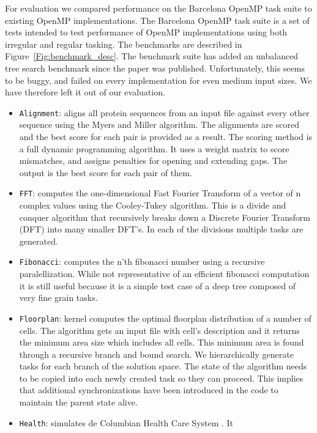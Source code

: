 \documentclass[sigconf]{acmart}
\begin{document}
For evaluation we compared performance on the Barcelona OpenMP task suite to 
existing OpenMP implementations. The Barcelona OpenMP task suite is a set of 
tests intended to test performance of OpenMP implementations using both
irregular and regular tasking. The benchmarks are described in
Figure~\ref{Fig:benchmark_desc}. The benchmark suite has added an unbalanced
tree search benchmark since the paper was published.  Unfortunately, this seems
to be buggy, and failed on every implementation for even medium input sizes. We
have therefore left it out of our evaluation.

\begin{itemize}
\item \texttt{Alignment}: aligns all protein sequences from  an  input
file  against  every  other  sequence  using  the Myers  and Miller \cite{}
algorithm. The alignments are scored and the best score for each pair is
provided as a result. The scoring method is  a  full  dynamic  programming
algorithm. It uses  a  weight matrix to score mismatches, and assigns
penalties for opening and extending gaps. The output is the best score for each
pair of them.
\item \texttt{FFT}: computes the one-dimensional Fast Fourier Transform
of a vector of n complex values using the Cooley-Tukey \cite{cooley-tukey}
algorithm. This is a divide and conquer algorithm that  recursively  breaks
down a Discrete Fourier Transform (DFT) into many smaller DFT’s. In each of the
divisions multiple tasks are generated.
\item \texttt{Fibonacci}: computes the n'th fibonacci number using a  recursive
paralellization. While  not  representative  of  an efficient  fibonacci
computation  it  is  still  useful  because  it  is a simple test case of a
deep tree composed of very fine grain tasks.  
\item \texttt{Floorplan}: kernel computes the optimal floorplan distribution
of a number of cells. The algorithm gets an input file with  cell’s
description  and  it  returns  the  minimum  area  size which includes all
cells. This minimum area is found through a recursive branch and bound search.
We hierarchically generate tasks  for  each  branch  of  the  solution  space.
The  state  of  the algorithm needs to be copied into each newly created task
so they can proceed. This implies that additional synchronizations have been
introduced in the code to maintain the parent state alive.
\item \texttt{Health}: simulates de Columbian Health Care System \cite{?}. It

\end{itemize}
\end{document}
